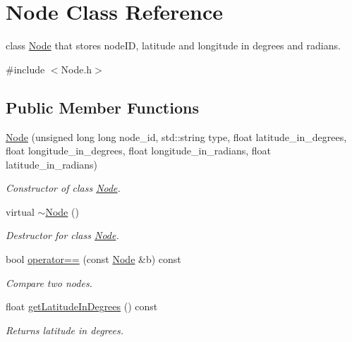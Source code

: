 \hypertarget{class_node}{}\section{Node Class Reference}
\label{class_node}


class \hyperlink{class_node}{Node} that stores node\+ID, latitude and longitude in degrees and radians.  




{\ttfamily \#include $<$Node.\+h$>$}

\subsection*{Public Member Functions}
\begin{DoxyCompactItemize}
\item 
\hyperlink{class_node_a5002dfe1d04665bbcfe7cce06f28d9a4}{Node} (unsigned long long node\+\_\+id, std\+::string type, float latitude\+\_\+in\+\_\+degrees, float longitude\+\_\+in\+\_\+degrees, float longitude\+\_\+in\+\_\+radians, float latitude\+\_\+in\+\_\+radians)
\begin{DoxyCompactList}\small\item\em Constructor of class \hyperlink{class_node}{Node}. \end{DoxyCompactList}\item 
\hypertarget{class_node_aa0840c3cb5c7159be6d992adecd2097c}{}\label{class_node_aa0840c3cb5c7159be6d992adecd2097c} 
virtual \hyperlink{class_node_aa0840c3cb5c7159be6d992adecd2097c}{$\sim$\+Node} ()
\begin{DoxyCompactList}\small\item\em Destructor for class \hyperlink{class_node}{Node}. \end{DoxyCompactList}\item 
bool \hyperlink{class_node_a551edd0a6b25f77d410d018c41219855}{operator==} (const \hyperlink{class_node}{Node} \&b) const
\begin{DoxyCompactList}\small\item\em Compare two nodes. \end{DoxyCompactList}\item 
\hypertarget{class_node_a0035b25f726770d811a8797dd2d81f97}{}\label{class_node_a0035b25f726770d811a8797dd2d81f97} 
float \hyperlink{class_node_a0035b25f726770d811a8797dd2d81f97}{get\+Latitude\+In\+Degrees} () const
\begin{DoxyCompactList}\small\item\em Returns latitude in degrees. \end{DoxyCompactList}\item 

\end{DoxyCompactItemize}
